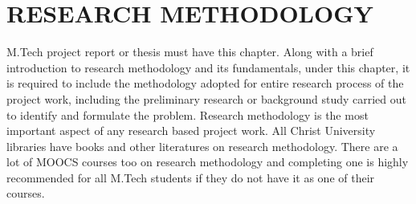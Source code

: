 \chapter{RESEARCH METHODOLOGY} 
\label{ChapterResearchMethodology} 


M.Tech project report or thesis must have this chapter. Along with a brief introduction to research methodology and its fundamentals, under this chapter, it is required to include the methodology adopted for entire research process of the project work, including the preliminary research or background study carried out to identify and formulate the problem. 
Research methodology is the most important aspect of any research based project work. All Christ University libraries have books and other literatures on research methodology. There are a lot of MOOCS courses too on research methodology and completing one is highly recommended for all M.Tech students if they do not have it as one of their courses. 



		



